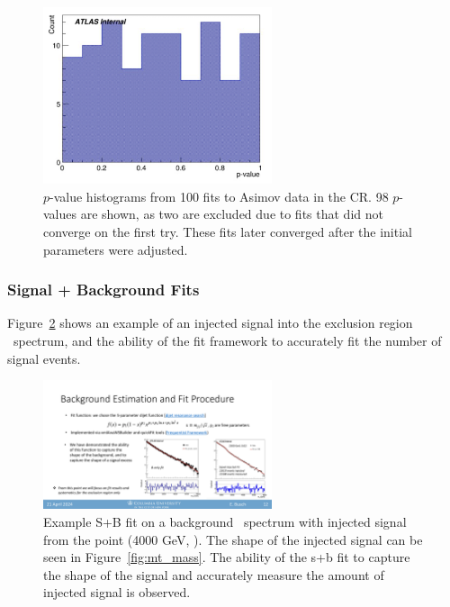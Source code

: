 \begin{figure}[!htbp]
\centering
   \includegraphics[width=0.6\textwidth]{figures/stats/asimov_cr_hist}
    \caption{$p$-value histograms from 100 fits to Asimov data in the CR. 98 $p$-values are shown, as two are excluded due to fits that did not converge on the first try. These fits later converged after the initial parameters were adjusted. %
    \label{fig:asimov_hist}}
\end{figure}

\clearpage
\subsubsection{Signal + Background Fits}
\label{subsec:fit_splusb}

Figure~\ref{fig:splusb_sigInj} shows an example of an injected signal into the exclusion region \mt~spectrum, and the ability of the fit framework to accurately fit the number of signal events.
\begin{figure}[!htbp]
\centering
   \includegraphics[width=0.6\textwidth]{figures/stats/splusb_sigInj}
    \caption{Example S+B fit on a background \mt~spectrum with injected signal from the point (4000 GeV, ). The shape of the injected signal can be seen in Figure~\ref{fig:mt_mass}. The ability of the s+b fit to capture the shape of the signal and accurately measure the amount of injected signal is observed.
    \label{fig:splusb_sigInj}}
\end{figure}


